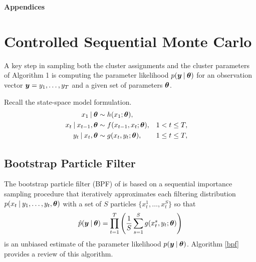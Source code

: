 \documentclass{article}
\begin{document}
%

%

\onecolumn


\setcounter{algorithm}{1} %
\setcounter{figure}{7}    %

\textbf{\huge Appendices}

\aistatsauthor{}

\appendix

\section{Controlled Sequential Monte Carlo}

A key step in sampling both the cluster assignments and the cluster parameters of Algorithm 1 is computing the parameter likelihood $p(\boldsymbol{y} \:\vert\: \boldsymbol{\theta})$ for an observation vector $\boldsymbol{y} = y_1, \ldots, y_T$ and a given set of parameters $\boldsymbol{\theta}$.  

\noindent Recall the state-space model formulation.
\begin{align*}
x_1 \:\vert\: \boldsymbol{\theta} &\sim h(x_1; \boldsymbol{\theta}), \\
x_t \:\vert\: x_{t-1}, \boldsymbol{\theta} &\sim f(x_{t-1}, x_t; \boldsymbol{\theta}),  & &1 < t \leq T, \\
y_t \:\vert\: x_t, \boldsymbol{\theta} &\sim g(x_t, y_t; \boldsymbol{\theta}), & & 1 \leq t \leq T,
\end{align*}

\subsection{Bootstrap Particle Filter}

The bootstrap particle filter (BPF) of \cite{doucet2001introduction} is based on a sequential importance sampling procedure that iteratively approximates each filtering distribution $p(x_t \:\vert\: y_1, \ldots, y_t, \boldsymbol{\theta})$ with a set of $S$ particles $\{x_t^1, \ldots, x_t^S\}$ so that
\begin{align*}
\hat{p}(\boldsymbol{y} \:\vert\: \boldsymbol{\theta}) = \prod_{t=1}^T \left(\frac{1}{S}\sum_{s=1}^S g(x_t^s, y_t; \boldsymbol{\theta})\right)
\end{align*}  
is an unbiased estimate of the parameter likelihood $p(\boldsymbol{y} \:\vert\: \boldsymbol{\theta})$.  Algorithm \ref{bpf} provides a review of this algorithm.
\end{document}
